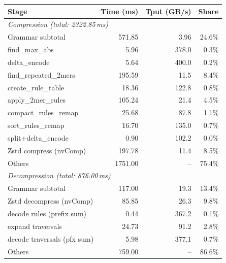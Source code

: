 \setlength{\tabcolsep}{2pt}
\begin{tabular}{l r r r}
  \hline
  \textbf{Stage}                     & \textbf{Time (ms)} & \textbf{Tput (GB/s)} & \textbf{Share} \\
  \hline
  \multicolumn{4}{l}{\textit{Compression (total: 2322.85\,ms)}}                                   \\
  Grammar subtotal                   & 571.85              & 3.96                  & 24.6\%         \\
  \quad find\_max\_abs               & 5.96                & 378.0                 & 0.3\%          \\
  \quad delta\_encode                & 5.64                & 400.0                 & 0.2\%          \\
  \quad find\_repeated\_2mers        & 195.59              & 11.5                  & 8.4\%          \\
  \quad create\_rule\_table          & 18.36               & 122.8                 & 0.8\%          \\
  \quad apply\_2mer\_rules           & 105.24              & 21.4                  & 4.5\%          \\
  \quad compact\_rules\_remap        & 25.68               & 87.8                  & 1.1\%          \\
  \quad sort\_rules\_remap           & 16.70               & 135.0                 & 0.7\%          \\
  \quad split+delta\_encode          & 0.90                & 102.2                 & 0.0\%          \\
  \quad Zstd compress (nvComp)       & 197.78              & 11.4                  & 8.5\%          \\
  Others                             & 1751.00             & --                    & 75.4\%         \\
  \hline
  \multicolumn{4}{l}{\textit{Decompression (total: 876.00\,ms)}}                                  \\
  Grammar subtotal                   & 117.00              & 19.3                  & 13.4\%         \\
  \quad Zstd decompress (nvComp)     & 85.85               & 26.3                  & 9.8\%          \\
  \quad decode rules (prefix sum)    & 0.44                & 367.2                 & 0.1\%          \\
  \quad expand traversals            & 24.73               & 91.2                  & 2.8\%          \\
  \quad decode traversals (pfx sum)  & 5.98                & 377.1                 & 0.7\%          \\
  Others                             & 759.00              & --                    & 86.6\%         \\
  \hline
\end{tabular}
